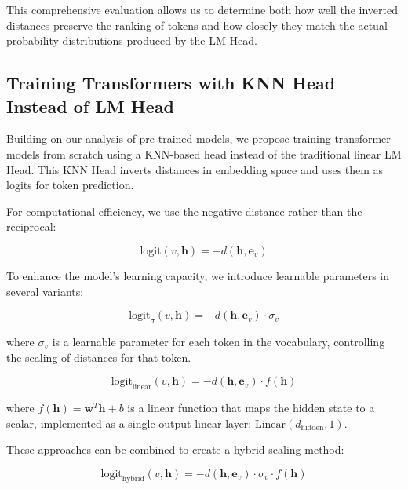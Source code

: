 This comprehensive evaluation allows us to determine both how well the inverted distances preserve the ranking of tokens and how closely they match the actual probability distributions produced by the LM Head.

\subsection{Training Transformers with KNN Head Instead of LM Head}

Building on our analysis of pre-trained models, we propose training transformer models from scratch using a KNN-based head instead of the traditional linear LM Head. This KNN Head inverts distances in embedding space and uses them as logits for token prediction.

For computational efficiency, we use the negative distance rather than the reciprocal:

\begin{equation}
    \text{logit}(v, \mathbf{h}) = -d(\mathbf{h}, \mathbf{e}_v)
    \label{eq::neg_distance}
\end{equation}

To enhance the model's learning capacity, we introduce learnable parameters in several variants:

\begin{equation}
    \text{logit}_{\sigma}(v, \mathbf{h}) = -d(\mathbf{h}, \mathbf{e}_v) \cdot \sigma_v
    \label{eq::sigma_scaling}
\end{equation}

where $\sigma_v$ is a learnable parameter for each token in the vocabulary, controlling the scaling of distances for that token.

\begin{equation}
    \text{logit}_{\text{linear}}(v, \mathbf{h}) = -d(\mathbf{h}, \mathbf{e}_v) \cdot f(\mathbf{h})
    \label{eq::linear_scaling}
\end{equation}

where $f(\mathbf{h}) = \mathbf{w}^T\mathbf{h} + b$ is a linear function that maps the hidden state to a scalar, implemented as a single-output linear layer: $\text{Linear}(d_{\text{hidden}}, 1)$.

These approaches can be combined to create a hybrid scaling method:

\begin{equation}
    \text{logit}_{\text{hybrid}}(v, \mathbf{h}) = -d(\mathbf{h}, \mathbf{e}_v) \cdot \sigma_v \cdot f(\mathbf{h})
    \label{eq::hybrid_scaling}
\end{equation}

